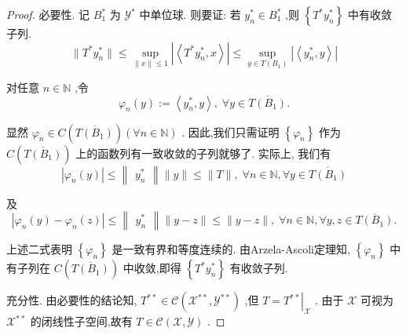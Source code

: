 \documentclass[lang=cn,newtx,10pt,scheme=chinese,thmcnt=chapter]{elegantbook}
\begin{document}
\begin{proof}
    必要性. 记 \({B}_{1}^{ * }\) 为 \({\mathcal{Y}}^{ * }\) 中单位球. 则要证: 若 \({y}_{n}^{ * } \in  {B}_{1}^{ * }\) ,则 \(\left\{  {{T}^{ * }{y}_{n}^{ * }}\right\}\) 中有收敛子列.\[
\|T^*y_n^*\|\leqslant \sup\limits_{\|x\|\leqslant 1}\left|\left\langle T^*y_n^*, x\right\rangle\right|\leqslant \sup\limits_{y\in T(B_1)}\left|\left\langle y_n^*, y\right\rangle\right|  
    \]
    
    对任意 \(n \in  \mathbb{N}\) ,令
\begin{equation*}
{\varphi }_{n}\left( y\right)  \mathrel{\text{ := }} \left\langle  {{y}_{n}^{ * },y}\right\rangle  ,\;\forall y \in  \overline{T\left( {B}_{1}\right) }.
\end{equation*}

显然 \({\varphi }_{n} \in  C\left( \overline{T\left( {B}_{1}\right) }\right) \left( {\forall n \in  \mathbb{N}}\right)\) . 因此,我们只需证明 \(\left\{  {\varphi }_{n}\right\}\) 作为 \(C\left( \overline{T\left( {B}_{1}\right) }\right)\) 上的函数列有一致收敛的子列就够了. 实际上, 我们有
\begin{equation*}
\left| {{\varphi }_{n}\left( y\right) }\right|  \leqslant  \begin{Vmatrix}{y}_{n}^{ * }\end{Vmatrix}\parallel y\parallel  \leqslant  \parallel T\parallel ,\;\forall n \in  \mathbb{N},\forall y \in  \overline{T\left( {B}_{1}\right) }
\end{equation*}

及
\begin{equation*}
\left| {{\varphi }_{n}\left( y\right)  - {\varphi }_{n}\left( z\right) }\right|  \leqslant  \begin{Vmatrix}{y}_{n}^{ * }\end{Vmatrix}\parallel y - z\parallel  \leqslant  \parallel y - z\parallel ,\;\forall n \in  \mathbb{N},\forall y,z \in  \overline{T\left( {B}_{1}\right) }.
\end{equation*}

上述二式表明 \(\left\{  {\varphi }_{n}\right\}\) 是一致有界和等度连续的. 由Arzela-Ascoli定理知, \(\left\{  {\varphi }_{n}\right\}\) 中有子列在 \(C\left( \overline{T\left( {B}_{1}\right) }\right)\) 中收敛,即得 \(\left\{  {{T}^{ * }{y}_{n}^{ * }}\right\}\) 有收敛子列.

充分性. 由必要性的结论知, \({T}^{* * } \in  \mathcal{C}\left( {{\mathcal{X}}^{* * },{\mathcal{Y}}^{* * }}\right)\) ,但 \(T = {\left. {T}^{* * }\right| }_{\mathcal{X}}\) . 由于 \(\mathcal{X}\) 可视为 \({\mathcal{X}}^{* * }\) 的闭线性子空间,故有 \(T \in  \mathcal{C}\left( {\mathcal{X},\mathcal{Y}}\right)\) .

\end{proof}
\end{document}
